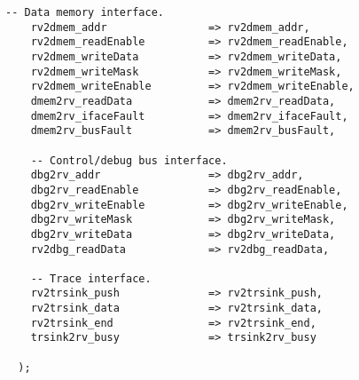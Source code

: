 \begin{lstlisting}[numbers=none]
    -- Data memory interface.
    rv2dmem_addr                => rv2dmem_addr,
    rv2dmem_readEnable          => rv2dmem_readEnable,
    rv2dmem_writeData           => rv2dmem_writeData,
    rv2dmem_writeMask           => rv2dmem_writeMask,
    rv2dmem_writeEnable         => rv2dmem_writeEnable,
    dmem2rv_readData            => dmem2rv_readData,
    dmem2rv_ifaceFault          => dmem2rv_ifaceFault,
    dmem2rv_busFault            => dmem2rv_busFault,
    
    -- Control/debug bus interface.
    dbg2rv_addr                 => dbg2rv_addr,
    dbg2rv_readEnable           => dbg2rv_readEnable,
    dbg2rv_writeEnable          => dbg2rv_writeEnable,
    dbg2rv_writeMask            => dbg2rv_writeMask,
    dbg2rv_writeData            => dbg2rv_writeData,
    rv2dbg_readData             => rv2dbg_readData,
    
    -- Trace interface.
    rv2trsink_push              => rv2trsink_push,
    rv2trsink_data              => rv2trsink_data,
    rv2trsink_end               => rv2trsink_end,
    trsink2rv_busy              => trsink2rv_busy
    
  );

\end{lstlisting}

